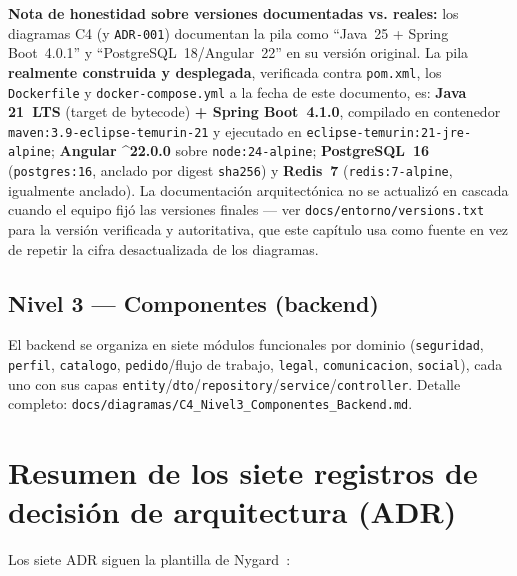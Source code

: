 \textbf{Nota de honestidad sobre versiones documentadas vs. reales:} los
diagramas C4 (y \texttt{ADR-001}) documentan la pila como ``Java~25 +
Spring Boot~4.0.1'' y ``PostgreSQL~18/Angular~22'' en su versión
original. La pila \textbf{realmente construida y desplegada}, verificada
contra \texttt{pom.xml}, los \texttt{Dockerfile} y
\texttt{docker-compose.yml} a la fecha de este documento, es: \textbf{Java
21~LTS} (target de bytecode) \textbf{+ Spring Boot~4.1.0}, compilado en
contenedor \texttt{maven:3.9-eclipse-temurin-21} y ejecutado en
\texttt{eclipse-temurin:21-jre-alpine}; \textbf{Angular \^{}22.0.0} sobre
\texttt{node:24-alpine}; \textbf{PostgreSQL~16} (\texttt{postgres:16},
anclado por digest \texttt{sha256}) y \textbf{Redis~7}
(\texttt{redis:7-alpine}, igualmente anclado). La documentación
arquitectónica no se actualizó en cascada cuando el equipo fijó las
versiones finales --- ver \texttt{docs/entorno/versions.txt} para la
versión verificada y autoritativa, que este capítulo usa como fuente en
vez de repetir la cifra desactualizada de los diagramas.

\subsection{Nivel 3 --- Componentes (backend)}

El backend se organiza en siete módulos funcionales por dominio
(\texttt{seguridad}, \texttt{perfil}, \texttt{catalogo},
\texttt{pedido}/flujo de trabajo, \texttt{legal}, \texttt{comunicacion},
\texttt{social}), cada uno con sus capas
\texttt{entity}/\texttt{dto}/\texttt{repository}/\texttt{service}/\texttt{controller}.
Detalle completo: \texttt{docs/diagramas/C4\_Nivel3\_Componentes\_Backend.md}.

\section{Resumen de los siete registros de decisión de arquitectura (ADR)}

Los siete ADR siguen la plantilla de Nygard~\cite{NYGARD2011}:

